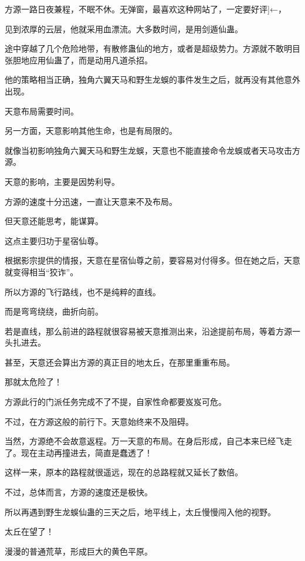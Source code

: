 
\begin{this_body}



方源一路日夜兼程，不眠不休。无弹窗，最喜欢这种网站了，一定要好评]←，

见到浓厚的云层，他就采用血漂流。大多数时间，是用剑遁仙蛊。

途中穿越了几个危险地带，有散修蛊仙的地方，或者是超级势力。方源就不敢明目张胆地应用仙蛊了，而是动用凡道杀招。

他的策略相当正确，独角六翼天马和野生龙蜈的事件发生之后，就再没有其他意外出现。

天意布局需要时间。

另一方面，天意影响其他生命，也是有局限的。

就像当初影响独角六翼天马和野生龙蜈，天意也不能直接命令龙蜈或者天马攻击方源。

天意的影响，主要是因势利导。

方源的速度十分迅速，一直让天意来不及布局。

但天意还能思考，能谋算。

这点主要归功于星宿仙尊。

根据影宗提供的情报，天意在星宿仙尊之前，要容易对付得多。但在她之后，天意就变得相当“狡诈”。

所以方源的飞行路线，也不是纯粹的直线。

而是弯弯绕绕，曲折向前。

若是直线，那么前进的路程就很容易被天意推测出来，沿途提前布局，等着方源一头扎进去。

甚至，天意还会算出方源的真正目的地太丘，在那里重重布局。

那就太危险了！

方源此行的门派任务完成不了不提，自家性命都要岌岌可危。

不过，在方源这般的前行下。天意始终来不及阻碍。

当然，方源绝不会故意返程。万一天意的布局。在身后形成，自己本来已经飞走了。现在主动再撞进去，简直是蠢透了！

这样一来，原本的路程就很遥远，现在的总路程就又延长了数倍。

不过，总体而言，方源的速度还是极快。

所以再遇到野生龙蜈仙蛊的三天之后，地平线上，太丘慢慢闯入他的视野。

太丘在望了！

漫漫的普通荒草，形成巨大的黄色平原。


\end{this_body}
